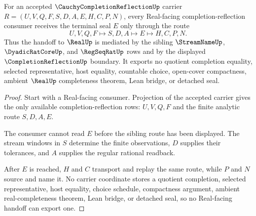 \begin{theorem}
\label{thm:cauchy-completion-reflection-real-seal-handoff}
For an accepted $\CauchyCompletionReflectionUp$ carrier $R=(U,V,Q,F,S,D,A,E,H,C,P,N)$, every Real-facing completion-reflection consumer receives the terminal seal $E$ only through the route
$$
U,V,Q,F \longmapsto S,D,A \longmapsto E \longmapsto H,C,P,N .
$$
Thus the handoff to $\RealUp$ is mediated by the sibling $\StreamNameUp$, $\DyadicRatCoreUp$, and $\RegSeqRatUp$ rows and by the displayed $\CompletionReflectionUp$ boundary. It exports no quotient completion equality, selected representative, host equality, countable choice, open-cover compactness, ambient $\RealUp$ completeness theorem, Lean bridge, or detached seal.
\end{theorem}
\begin{proof}
Start with a Real-facing consumer. Projection of the accepted carrier gives the only available completion-reflection rows: $U,V,Q,F$ and the finite analytic route $S,D,A,E$.

The consumer cannot read $E$ before the sibling route has been displayed. The stream windows in $S$ determine the finite observations, $D$ supplies their tolerances, and $A$ supplies the regular rational readback.

After $E$ is reached, $H$ and $C$ transport and replay the same route, while $P$ and $N$ source and name it. No carrier coordinate stores a quotient completion, selected representative, host equality, choice schedule, compactness argument, ambient real-completeness theorem, Lean bridge, or detached seal, so no Real-facing handoff can export one.
\end{proof}


\begin{closurestatus}{\CauchyCompletionReflectionUp}
  \theoryclosure{\seedClosure}
  \formalstatus{\unformalizedV}
\end{closurestatus}

